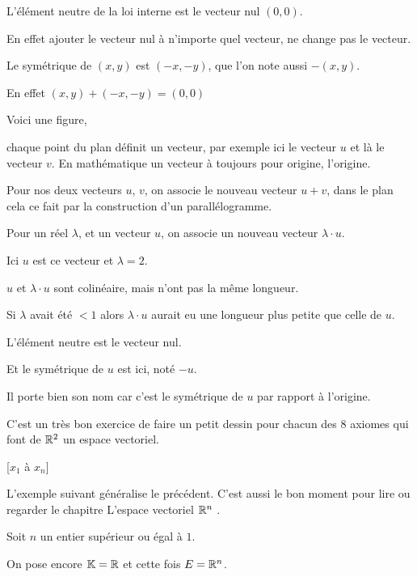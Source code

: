   
\change

L'élément neutre de la loi interne est le vecteur nul $(0,0)$. 

En effet ajouter le vecteur nul à n'importe quel vecteur, ne change pas le vecteur.

\change

Le symétrique de $(x,y)$ est $(-x,-y)$, que l'on note aussi $-(x,y)$.

En effet $(x,y) + (-x,-y) = (0,0)$
 


\diapo

Voici une figure,

chaque point du plan définit un vecteur, par exemple ici le vecteur $u$
et là le vecteur $v$. En mathématique un vecteur à toujours pour origine, l'origine.



Pour nos deux vecteurs $u$, $v$, 
on associe le nouveau vecteur $u+v$,
dans le plan cela ce fait par la construction d'un parallélogramme.

Pour un réel $\lambda$, et un vecteur $u$,
on associe un nouveau vecteur $\lambda \cdot u$.

Ici $u$ est ce vecteur et $\lambda =2$.

$u$ et $\lambda \cdot u$ sont colinéaire, mais n'ont pas la même longueur.

Si $\lambda$ avait été $<1$ alors $\lambda \cdot u$ aurait eu une longueur plus petite que celle de $u$.


L'élément neutre est le vecteur nul.

Et le symétrique de $u$ est ici, noté $-u$.

Il porte bien son nom car c'est le symétrique de $u$ par rapport à l'origine.

C'est un très bon exercice de faire un petit dessin pour chacun des 8 axiomes
qui font de $\mathbb{R}^2$ un espace vectoriel.

\diapo

[$x_1$ à $x_n$]

L'exemple suivant généralise le précédent. 
C'est aussi le bon moment pour lire ou regarder le chapitre \og L'espace vectoriel $\mathbb{R}^n$ \fg.
  

Soit $n$ un entier supérieur ou égal à $1$.   

On pose encore $\mathbb{K}=\mathbb{R}$ et cette fois $E=\mathbb{R}^n$.

\change

